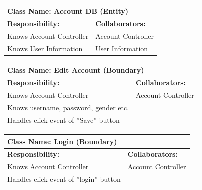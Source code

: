 \documentclass[]{article}
\begin{document}
\begin{table}[H]
    \centering
    \begin{tabular}{|p{}|p{}|}
        \hline
        \multicolumn{2}{|l|}{\textbf{Class Name:} Account DB (Entity)} \\
        \hline
        \textbf{Responsibility:} & \textbf{Collaborators:} \\
        \hline
        Knows Account Controller & Account Controller \\
        Knows User Information & User Information \\
        \hline
    \end{tabular}
    \label{tab:account_db}
\end{table}

\begin{table}[H]
    \centering
    \begin{tabular}{|p{}|p{}|}
        \hline
        \multicolumn{2}{|l|}{\textbf{Class Name:} Edit Account (Boundary)} \\
        \hline
        \textbf{Responsibility:} & \textbf{Collaborators:} \\
        \hline
        Knows Account Controller & Account Controller \\
        Knows username, password, gender etc. & \\
        Handles click-event of ”Save” button & \\
        \hline
    \end{tabular}
    \label{tab:edit_account}
\end{table}

\begin{table}[H]
    \centering
    \begin{tabular}{|p{}|p{}|}
        \hline
        \multicolumn{2}{|l|}{\textbf{Class Name:} Login (Boundary)} \\
        \hline
        \textbf{Responsibility:} & \textbf{Collaborators:} \\
        \hline
        Knows Account Controller & Account Controller \\
        Handles click-event of ”login” button &  \\
        \hline
    \end{tabular}
    \label{tab:login}
\end{table}
\end{document}
